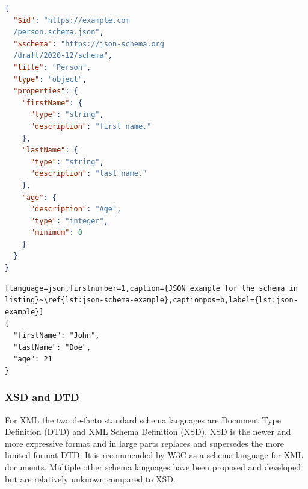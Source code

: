 \begin{lstlisting}[language=json,firstnumber=1,caption={JSON schema example},captionpos=b,label={lst:json-schema-example}]
{
  "$id": "https://example.com
  /person.schema.json",
  "$schema": "https://json-schema.org
  /draft/2020-12/schema",
  "title": "Person",
  "type": "object",
  "properties": {
    "firstName": {
      "type": "string",
      "description": "first name."
    },
    "lastName": {
      "type": "string",
      "description": "last name."
    },
    "age": {
      "description": "Age",
      "type": "integer",
      "minimum": 0
    }
  }
}
\end{lstlisting}


\begin{lstlisting}[language=json,firstnumber=1,caption={JSON example for the schema in listing}~\ref{lst:json-schema-example},captionpos=b,label={lst:json-example}]
{
  "firstName": "John",
  "lastName": "Doe",
  "age": 21
}
\end{lstlisting}

\subsubsection{XSD and DTD}
For XML the two de-facto standard schema languages are Document Type Definition (DTD)\cite{dtd_spec} and XML Schema Definition (XSD)\cite{xsd_spec}.
XSD is the newer and more expressive format and in large parts replaces and supersedes the more limited format DTD\cite{dtd_vs_xsd}.
It is recommended by W3C as a schema language for XML documents\cite{xsd_spec}.
Multiple other schema languages have been proposed and developed but are relatively unknown compared to XSD\cite{xml_schemas_1,xml_schemas_2}.

